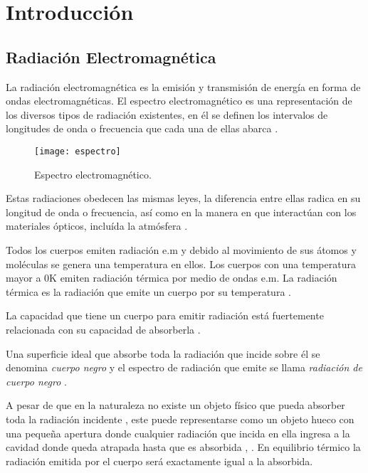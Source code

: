 \chapter{Introducción}

    \lipsum[1]
    
    \section{Radiación Electromagnética}
    La radiación electromagnética es la emisión y transmisión de energía en forma de ondas electromagnéticas. El espectro electromagnético es una representación de los diversos tipos de radiación existentes, en él se definen los intervalos de longitudes de onda o frecuencia que cada una de ellas abarca \cite{Chang}.
            \begin{figure}[hbtp]
                \centering
                \texttt{[image: espectro]}
                \caption{Espectro electromagnético.}
                \label{fig:espectro}
            \end{figure}    
    
    Estas radiaciones obedecen las mismas leyes, la diferencia entre ellas radica en su longitud de onda o frecuencia, así como en la manera en que interactúan con los materiales ópticos, incluída la atmósfera \cite{Vincent}.
    
    Todos los cuerpos emiten radiación e.m  y debido al movimiento de sus átomos y moléculas se genera una temperatura en ellos. Los cuerpos con una temperatura mayor a 0K emiten radiación térmica por medio de ondas e.m. La radiación térmica es la radiación que emite un cuerpo por su temperatura \cite{Hollands}.
    
    La capacidad que tiene un cuerpo para emitir radiación está fuertemente relacionada con su capacidad de absorberla \cite{Beiser}.
    
    Una superficie ideal que absorbe toda la radiación que incide sobre él se denomina \textit{cuerpo negro} y el espectro de radiación que emite se llama \textit{radiación de cuerpo negro} \cite{Sears}.
    
    A pesar de que en la naturaleza no existe un objeto físico que pueda absorber toda la radiación incidente \cite{FUV3}, este puede representarse como un objeto hueco con una pequeña apertura donde cualquier radiación que incida en ella ingresa a la cavidad donde queda atrapada hasta que es absorbida \cite{Beiser}, \cite{FUV3}. En equilibrio térmico la radiación emitida por el cuerpo será exactamente igual a la absorbida.
    
